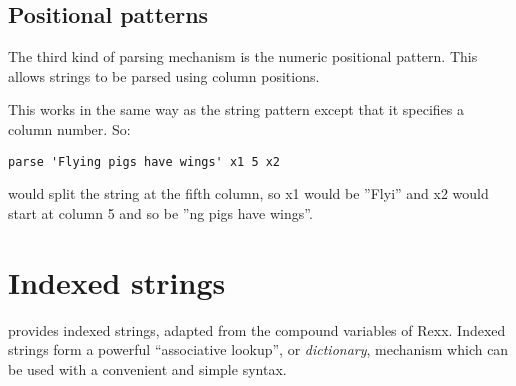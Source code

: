 \subsection{Positional patterns}
The third kind of parsing mechanism is the numeric positional
pattern. This allows strings to be parsed using column positions.

This works in the same way as the string pattern except that it
specifies a column number. So:
\begin{lstlisting}[label=positional,caption=Positional Parsing]
    parse 'Flying pigs have wings' x1 5 x2
\end{lstlisting}                        
would split the string at the fifth column, so x1 would be ”Flyi” 
and x2 would start at column 5 and so be ”ng pigs have wings”.
                                        
\section{Indexed strings}
\nr{} provides indexed strings, adapted from the compound variables of Rexx. Indexed strings form a powerful “associative lookup”, or \emph{dictionary}, mechanism which can be used with a convenient and simple syntax.

